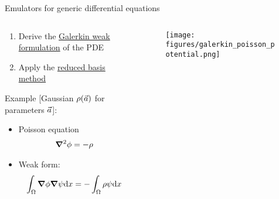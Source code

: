 \documentclass[xcolor=dvipsnames, aspectratio=169]{beamer}
\begin{document}
\begin{frame}{Emulators for generic differential equations}
\begin{columns}[t]
\begin{column}{0.55\textwidth}
\begin{enumerate}
\item Derive the \alert{\href{https://en.wikipedia.org/wiki/Galerkin_method}{Galerkin weak formulation}} of the PDE
\item Apply the \alert{\href{https://doi.org/10.1137/151004550}{reduced basis method}}
\end{enumerate}
Example [Gaussian $\rho(\vec{a})$ for parameters $\vec{a}$]:
\begin{itemize}
\item Poisson equation
\begin{align*}
\grad^2 \phi = -\rho
\end{align*}
\item Weak form:
\begin{align*}
\int_{\Omega} \grad\phi\grad\psi \textup{d}x = -\int_{\Omega}\rho \psi \textup{d}x
\end{align*}
\end{itemize}
\end{column}
\begin{column}{0.5\textwidth}
\begin{figure}
\vspace{-0.4cm}
\texttt{[image: figures/galerkin\_poisson\_potential.png]}
\end{figure}
\end{column}
\end{columns}
\end{frame}


\end{document}

